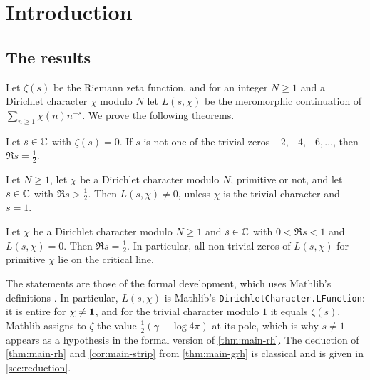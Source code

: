 \section{Introduction}\label{sec:intro}

\subsection{The results}\label{sec:intro:results}

Let $\zeta(s)$ be the Riemann zeta function, and for an integer $N\ge1$ and a Dirichlet character
$\chi$ modulo $N$ let $L(s,\chi)$ be the meromorphic continuation of $\sum_{n\ge1}\chi(n)n^{-s}$.
We prove the following theorems.

\begin{theorem}\label{thm:main-rh}
Let $s\in\mathbb{C}$ with $\zeta(s)=0$. If $s$ is not one of the trivial zeros $-2,-4,-6,\dots$, then
$\Re s=\frac12$.
\end{theorem}

\begin{theorem}\label{thm:main-grh}
Let $N\ge1$, let $\chi$ be a Dirichlet character modulo $N$, primitive or not, and let $s\in\mathbb{C}$ with
$\Re s>\frac12$. Then $L(s,\chi)\neq0$, unless $\chi$ is the trivial character and $s=1$.
\end{theorem}

\begin{corollary}\label{cor:main-strip}
Let $\chi$ be a Dirichlet character modulo $N\ge1$ and $s\in\mathbb{C}$ with $0<\Re s<1$ and $L(s,\chi)=0$.
Then $\Re s=\frac12$. In particular, all non-trivial zeros of $L(s,\chi)$ for primitive $\chi$ lie on
the critical line.
 
\end{corollary}

The statements are those of the formal development, which uses Mathlib's definitions
\cite{Mathlib2020}. In particular, $L(s,\chi)$ is Mathlib's \texttt{DirichletCharacter.LFunction}:
it is entire for $\chi\neq\mathbf{1}$, and for the trivial character modulo $1$ it equals $\zeta(s)$.
Mathlib assigns to $\zeta$ the value $\frac12(\gamma-\log4\pi)$ at its pole, which is why $s\neq1$
appears as a hypothesis in the formal version of \cref{thm:main-rh}. The deduction of
\cref{thm:main-rh} and \cref{cor:main-strip} from \cref{thm:main-grh} is classical and is given in
\cref{sec:reduction}.

